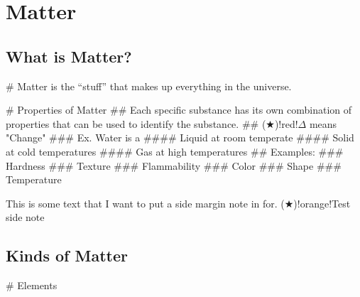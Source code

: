 \documentclass[../../Main/main.tex]{subfiles}
\begin{document}
\chapter{Matter}

\section{What is Matter?}
\begin{easylist}
	# \colorbox{dracPink}{Matter is the “stuff” that makes up everything in the universe.}


	# Properties of Matter
	## Each specific substance has its own combination of properties that can be used to identify the substance.
	## \sidenote($\bigstar$)!red!{$\Delta$ means "Change"}
	### Ex. Water is a
	####  Liquid at room temperate
	####  Solid at cold temperatures
	####  Gas at high temperatures
	## Examples:
	### Hardness
	### Texture
	### Flammability
	### Color
	### Shape
	### Temperature

	\bigskip

	This is some text that I want to put a side margin note in for. \sidenote($\bigstar$)!orange!{Test side note}
	\newpage


	\section{Kinds of Matter}

	

	# Elements



\end{easylist}
\end{document}
